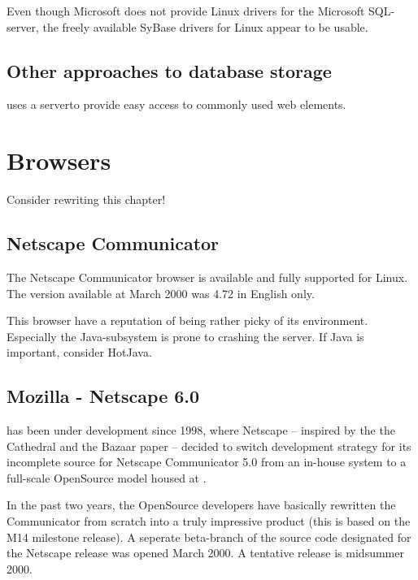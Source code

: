   Even though Microsoft does not provide Linux drivers for the
  Microsoft SQL-server, the freely available SyBase drivers for Linux
  appear to be usable.

\subsection{Other approaches to database storage}

 uses a
 serverto provide easy access to commonly
used web elements.


\section{Browsers}
\textsf{Consider rewriting this chapter!}

\subsection{Netscape Communicator}
\label{sec:netscape-communicator}

The Netscape Communicator browser is available and fully supported for
Linux.  The version available at March 2000 was 4.72 in English only.

This browser have a reputation of being rather picky of its
environment.  Especially the Java-subsystem is prone to crashing the
server.  If Java is important, consider HotJava.


\subsection{Mozilla - Netscape 6.0}
\label{sec:mozilla}

 has been under
development since 1998, where Netscape -- inspired by the \textsf{the
Cathedral and the Bazaar} paper -- decided to switch development
strategy for its incomplete source for Netscape Communicator 5.0 from
an in-house system to a full-scale OpenSource model housed at
.

In the past two years, the OpenSource developers have basically
rewritten the Communicator from scratch into a truly impressive
product (this is based on the M14 milestone release).  A seperate
beta-branch of the source code designated for the Netscape release was
opened March 2000. A tentative release is midsummer 2000.

